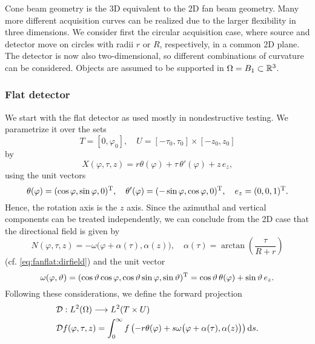 \documentclass{amsart}
\renewcommand*{\phi}{\varphi}
\begin{document}
Cone beam geometry is the 3D equivalent to the 2D fan beam geometry. Many more different acquisition curves can be realized due to the 
larger flexibility in three dimensions. We consider first the circular acquisition case, where source and detector move on circles with 
radii $r$ or $R$, respectively, in a common 2D plane. The detector is now also two-dimensional, so different combinations of curvature can 
be considered. Objects are assumed to be supported in $\Omega = B_1 \subset {\ensuremath{\mathbb{R}}}^3$.

\subsubsection{Flat detector}
\label{sec:applications:cone_circular:flat}

We start with the flat detector as used mostly in nondestructive testing. We parametrize it over the sets
%
\begin{equation}
 \label{eq:coneflat:params}
 T = [0, \phi_0], \quad U = [-\tau_0, \tau_0] \times [-z_0, z_0]
\end{equation}
%
by
%
\begin{equation}
 \label{eq:coneflat:detector_parametr}
 X(\phi, \tau, z) = r\theta(\phi) + \tau\, \theta'(\phi) + z\, e_z,
\end{equation} 
%
using the unit vectors
%
\begin{equation}
 \label{eq:coneflat:unit_vectors}
 \theta(\phi) = \TRANSP{(\cos\phi, \sin\phi, 0)}, \quad \theta'(\phi) = \TRANSP{(-\sin\phi, \cos\phi, 0)}, \quad e_z = \TRANSP{(0,0,1)}.
\end{equation}
%
Hence, the rotation axis is the $z$ axis. Since the azimuthal and vertical components can be treated independently, we can conclude from 
the 2D case that the directional field is given by
%
\begin{equation}
 \label{eq:coneflat:direction_field}
 N(\phi, \tau, z) = - \omega\big(\phi + \alpha(\tau), \alpha(z)\big), \quad \alpha(\tau) = \arctan\left( \frac{\tau}{R+r} \right)
\end{equation}
%
(cf. \eqref{eq:fanflat:dirfield}) and the unit vector
%
\begin{equation}
 \label{eq:coneflat:unit_vec_3d}
 \omega(\phi, \vartheta) = \TRANSP{(\cos\vartheta\cos\phi, \cos\vartheta\sin\phi, \sin\vartheta)} = \cos\vartheta\, \theta(\phi) + 
 \sin\vartheta\, e_z.
\end{equation} 
%
Following these considerations, we define the forward projection
%
\begin{align}
 &\OPD: L^2(\Omega) \Lto L^2(T \times U) \\
 \label{eq:coneflat:fwdproj}
 &\OPD f(\phi, \tau, z) = \int_0^\infty f\left( -r\theta(\phi) + s \omega\big(\phi + \alpha(\tau), \alpha(z)\big) \right) \D s.
\end{align}
\end{document}
